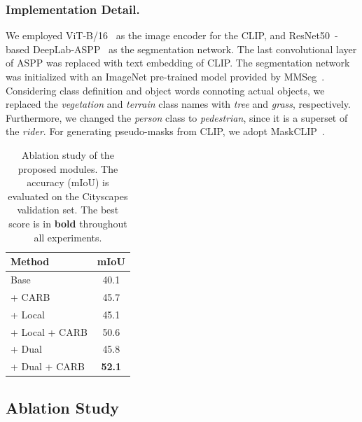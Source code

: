 \documentclass[letterpaper]{article} %
\begin{document}
\subsubsection{Implementation Detail.} 
We employed ViT-B/16~\cite{dosovitskiyimage} as the image encoder for the CLIP, and ResNet50~\cite{he2016deep}-based DeepLab-ASPP~\cite{chen2017deeplab} as the segmentation network. The last convolutional layer of ASPP was replaced with text embedding of CLIP. The segmentation network was initialized with an ImageNet pre-trained model provided by MMSeg~\cite{mmseg2020}. Considering class definition and object words connoting actual objects, we replaced the \textit{vegetation} and \textit{terrain} class names with \textit{tree} and \textit{grass}, respectively. Furthermore, we changed the \textit{person} class to \textit{pedestrian}, since it is a superset of the \textit{rider}. For generating pseudo-masks from CLIP, we adopt MaskCLIP~\cite{zhou2022extract}. 

\begin{table}[]
\normalsize
\centering
{\small
\begin{tabular}{@{}lc@{}}
\toprule
Method          & \multicolumn{1}{c}{mIoU}  \\ \midrule
Base                                & \multicolumn{1}{c}{40.1} \\
\multicolumn{1}{l}{+ CARB}           & \multicolumn{1}{c}{45.7} \\
\multicolumn{1}{l}{+ Local}          & \multicolumn{1}{c}{45.1} \\ 
\multicolumn{1}{l}{+ Local + CARB}   & \multicolumn{1}{c}{50.6} \\ 
\multicolumn{1}{l}{+ Dual}           & \multicolumn{1}{c}{45.8} \\ 
\multicolumn{1}{l}{+ Dual + CARB}    & \multicolumn{1}{c}{\textbf{52.1}} \\

\bottomrule
\end{tabular}
}
\caption{Ablation study of the proposed modules. The accuracy (mIoU) is evaluated on the Cityscapes validation set. The best score is in \textbf{bold} throughout all experiments.} 
\label{tab:split}
\end{table}
 
\subsection{Ablation Study}
\label{sec:ablation}
\end{document}
